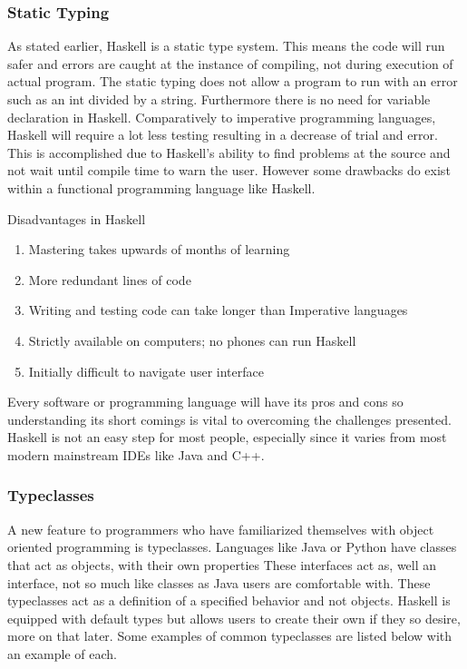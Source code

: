 \documentclass{article}
\begin{document}
    \subsubsection{Static Typing}
    As stated earlier, Haskell is a static type system. This means the code will run safer and errors are caught at the instance of compiling, not during execution of actual program. The static typing does not allow a program to run with an error such as an int divided by a string. Furthermore there is no need for variable declaration in Haskell. Comparatively to imperative programming languages, Haskell will require a lot less testing resulting in a decrease of trial and error. This is accomplished due to Haskell's ability to find problems at the source and not wait until compile time to warn the user. However some drawbacks do exist within a functional programming language like Haskell. 
    
    \medskip
    \caption{Disadvantages in Haskell}
       \begin{enumerate}
           \item Mastering takes upwards of months of learning
           \item More redundant lines of code
           \item Writing and testing code can take longer than Imperative languages
           \item Strictly available on computers; no phones can run Haskell
           \item Initially difficult to navigate user interface 
        \end{enumerate}
        
    \noindent Every software or programming language will have its pros and cons so understanding its short comings is vital to overcoming the challenges presented. Haskell is not an easy step for most people, especially since it varies from most modern mainstream IDEs like Java and C++. 
    
    \subsubsection{Typeclasses}
    A new feature to programmers who have familiarized themselves with object oriented programming is typeclasses. Languages like Java or Python have classes that act as objects, with their own properties These interfaces act as, well an interface, not so much like classes as Java users are comfortable with. These typeclasses act as a definition of a specified behavior and not objects. Haskell is equipped with default types but allows users to create their own if they so desire, more on that later. Some examples of common typeclasses are listed below with an example of each.
    \medskip
    
\end{document}
